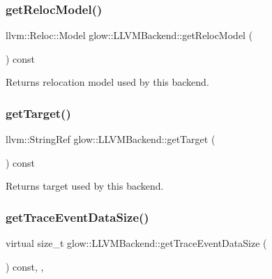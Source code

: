\subsubsection{\texorpdfstring{get\+Reloc\+Model()}{getRelocModel()}}
{\footnotesize\ttfamily llvm\+::\+Reloc\+::\+Model glow\+::\+L\+L\+V\+M\+Backend\+::get\+Reloc\+Model (\begin{DoxyParamCaption}{ }\end{DoxyParamCaption}) const\hspace{0.3cm}{\ttfamily [inline]}}

\begin{DoxyReturn}{Returns}
relocation model used by this backend. 
\end{DoxyReturn}
\mbox{\label{classglow_1_1_l_l_v_m_backend_a6b0a27a6fab23e210d639b5d43b74887}} 
\subsubsection{\texorpdfstring{get\+Target()}{getTarget()}}
{\footnotesize\ttfamily llvm\+::\+String\+Ref glow\+::\+L\+L\+V\+M\+Backend\+::get\+Target (\begin{DoxyParamCaption}{ }\end{DoxyParamCaption}) const\hspace{0.3cm}{\ttfamily [inline]}}

\begin{DoxyReturn}{Returns}
target used by this backend. 
\end{DoxyReturn}
\mbox{\label{classglow_1_1_l_l_v_m_backend_a68a62d93b6005ee8678d34c70365417b}} 
\subsubsection{\texorpdfstring{get\+Trace\+Event\+Data\+Size()}{getTraceEventDataSize()}}
{\footnotesize\ttfamily virtual size\+\_\+t glow\+::\+L\+L\+V\+M\+Backend\+::get\+Trace\+Event\+Data\+Size (\begin{DoxyParamCaption}{ }\end{DoxyParamCaption}) const\hspace{0.3cm}{\ttfamily [inline]}, {\ttfamily [override]}, {\ttfamily [virtual]}}

